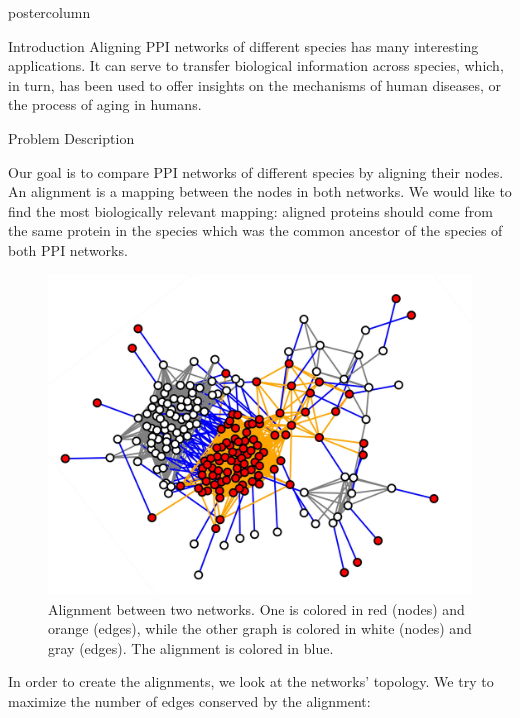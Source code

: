 \documentclass[final,hyperref={pdfpagelabels=false}]{beamer}
\begin{document}
\begin{frame}
\begin{columns}
\begin{column}{.49\textwidth}
\begin{beamercolorbox}[center,wd=\textwidth]{postercolumn}
\begin{minipage}[T]{.95\textwidth}
{\begin{block}{Introduction}
Aligning PPI networks of different species has many interesting applications. It can serve to transfer biological information across species, which, in turn, has been used to offer insights on the mechanisms of human diseases, or the process of aging in humans.

            \end{block}
            \vspace{50px}
 
 
 
            \begin{block}{Problem Description}

Our goal is to compare PPI networks of different species by aligning their nodes. An alignment is a mapping between the nodes in both networks.
We would like to find the most biologically relevant mapping: aligned proteins should come from the same protein in the species which was the common ancestor of the species of both PPI networks.

\begin{figure}
\centering
\includegraphics[width=0.6\linewidth]{../figures/net_align}
\caption{Alignment between two networks. One is colored in red
(nodes) and orange (edges), while the other graph is colored in white (nodes) and gray
(edges). The alignment is colored in blue.}
\label{fig:net_align}
\end{figure}

In order to create the alignments, we look at the networks' topology. We try to maximize the number of edges conserved by the alignment:


\end{block}}
\end{minipage}
\end{beamercolorbox}
\end{column}
\end{columns}
\end{frame}
\end{document}
